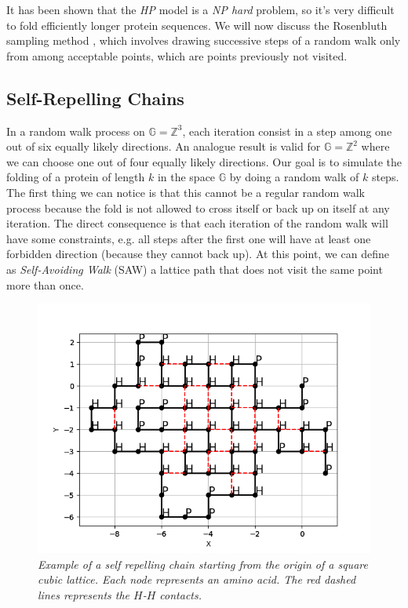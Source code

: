 It has been shown that the \emph{HP} model is a \emph{NP hard} problem, so it's very difficult to fold efficiently longer protein sequences.
We will now discuss the Rosenbluth sampling method \cite{PERM}, which involves drawing successive steps of a random walk only from among acceptable points, which are points previously not visited.

\subsection{Self-Repelling Chains}
In a random walk process on $\mathbb{G} = \mathbb{Z}^3$, each iteration consist in a step among one out of six equally likely directions.
An analogue result is valid for $\mathbb{G} = \mathbb{Z}^2$ where we can choose one out of four equally likely directions.
Our goal is to simulate the folding of a protein of length $k$ in the space $\mathbb{G}$ by doing a random walk of $k$ steps.
The first thing we can notice is that this cannot be a regular random walk process because the fold is not allowed to cross itself or back up on itself at any iteration.
The direct consequence is that each iteration of the random walk will have some constraints, e.g. all steps after the first one will have at least one forbidden direction (because they cannot back up).
At this point, we can define as \emph{Self-Avoiding Walk} (SAW) a lattice path that does not visit the same point more than once.
\begin{figure}[H]
    \centering
    \includegraphics[width=.75\textwidth]{./img/src_example.png}
    \caption{\emph{Example of a self repelling chain starting from the origin of a square cubic lattice.
                    Each node represents an amino acid.
                    The red dashed lines represents the $H$-$H$ contacts.}}
    \label{fig:src_example}
\end{figure}
